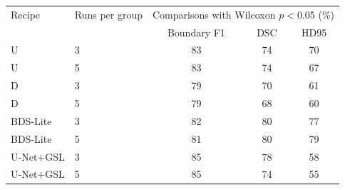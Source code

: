 \begin{tabular}{llccc}
\toprule
Recipe & Runs per group & \multicolumn{3}{c}{Comparisons with Wilcoxon $p<0.05$ (\%)} \\
 & & Boundary F1 & DSC & HD95 \\
\midrule
U & 3 & 83 & 74 & 70 \\
U & 5 & 83 & 74 & 67 \\
D & 3 & 79 & 70 & 61 \\
D & 5 & 79 & 68 & 60 \\
BDS-Lite & 3 & 82 & 80 & 77 \\
BDS-Lite & 5 & 81 & 80 & 79 \\
U-Net+GSL & 3 & 85 & 78 & 58 \\
U-Net+GSL & 5 & 85 & 74 & 55 \\
\bottomrule
\end{tabular}
